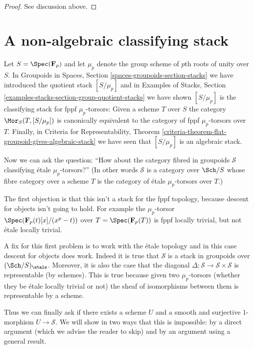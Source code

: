 \begin{proof}
See discussion above.
\end{proof}



\section{A non-algebraic classifying stack}
\label{section-non-algebraic}

\noindent
Let $S = \Spec(\mathbf{F}_p)$ and let $\mu_p$ denote the
group scheme of $p$th roots of unity over $S$. In
Groupoids in Spaces, Section \ref{spaces-groupoids-section-stacks}
we have introduced the quotient stack $[S/\mu_p]$ and in
Examples of Stacks, Section \ref{examples-stacks-section-group-quotient-stacks}
we have shown $[S/\mu_p]$ is the classifying stack for
fppf $\mu_p$-torsors: Given a scheme $T$ over $S$ the category
$\Mor_S(T, [S/\mu_p])$ is canonically equivalent to the
category of fppf $\mu_p$-torsors over $T$. Finally, in
Criteria for Representability, Theorem
\ref{criteria-theorem-flat-groupoid-gives-algebraic-stack}
we have seen that $[S/\mu_p]$ is an algebraic stack.

\medskip\noindent
Now we can ask the question: ``How about the category fibred in groupoids
$\mathcal{S}$ classifying \'etale $\mu_p$-torsors?'' (In other words
$\mathcal{S}$ is a category over $\Sch/S$ whose fibre category over a
scheme $T$ is the category of \'etale $\mu_p$-torsors over $T$.)

\medskip\noindent
The first objection is that this isn't a stack for the fppf topology,
because descent for objects isn't going to hold. For example the
$\mu_p$-torsor $\Spec(\mathbf{F}_p(t)[x]/(x^p - t))$ over
$T = \Spec(\mathbf{F}_p(T))$ is fppf locally trivial, but
not \'etale locally trivial.

\medskip\noindent
A fix for this first problem is to work with the \'etale topology and
in this case descent for objects does work. Indeed it is true that
$\mathcal{S}$ is a stack in groupoids over $(\Sch/S)_\etale$.
Moreover, it is also the case that the diagonal
$\Delta : \mathcal{S} \to \mathcal{S} \times \mathcal{S}$
is representable (by schemes). This is true because given two
$\mu_p$-torsors (whether they be \'etale locally trivial or not)
the sheaf of isomorphisms between them is representable by a scheme.

\medskip\noindent
Thus we can finally ask if there exists a scheme $U$ and a smooth
and surjective $1$-morphism $U \to \mathcal{S}$. We will show in two
ways that this is impossible: by a direct argument (which we advise
the reader to skip) and by an argument using a general result.

